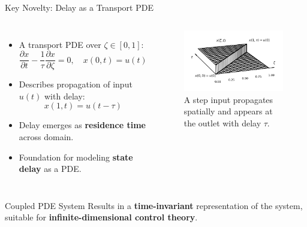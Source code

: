 \documentclass[8pt]{beamer}
\let\oldcitep\citep
\renewcommand{\citep}[1]{\textcolor{gray}{\oldcitep{#1}}}
\begin{document}
\begin{frame}{Key Novelty: Delay as a Transport PDE}
\begin{columns}[c]

\begin{itemize}
    \item A transport PDE over \( \zeta \in [0, 1] \):
    \[
        \frac{\partial x}{\partial t} - \frac{1}{\tau} \frac{\partial x}{\partial \zeta} = 0, \quad
        x(0, t) = u(t)
    \]
    \item Describes propagation of input \( u(t) \) with delay:
    \[
        x(1, t) = u(t - \tau)
    \]
    \item Delay emerges as \textbf{residence time} across domain.
    \item Foundation for modeling \textbf{state delay} as a PDE. \citep{krstic2009book}
\end{itemize}

\begin{figure}
    \centering
    \includegraphics[width=\linewidth]{figures/transport_delay.png}
    \caption{A step input propagates spatially and appears at the outlet with delay \(\tau\).}
\end{figure}
\end{columns}

\begin{block}{Coupled PDE System}
    Results in a \textbf{time-invariant} representation of the system, suitable for \textbf{infinite-dimensional control theory}.
\end{block}

\end{frame}
\end{document}
